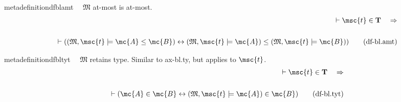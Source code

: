 \begin{restatable}{metadefinition}{dfblamt}~~ $\mathfrak{M}$ at-most is at-most.
\begin{align}
\vdash \msc{t} \in \mathbf{T}\quad\Rightarrow \notag \\ 
	 \notag \\ 
	\quad \vdash ( ( \mathfrak{M} ,
    \msc{t} \models \mc{A} \le \mc{B} ) \leftrightarrow ( \mathfrak{M} ,
    \msc{t} \models \mc{A} ) \le ( \mathfrak{M} , \msc{t} \models \mc{B} )
    )\label{eq:df-bl.amt}\tag{df-bl.amt}
\end{align}
\end{restatable}

\begin{restatable}{metadefinition}{dfbltyt}~~ $\mathfrak{M}$ retains type.
  Similar to ax-bl.ty, but applies to $\msc{t}$.
\begin{align}
\vdash \msc{t} \in \mathbf{T}\quad\Rightarrow \notag \\ 
	 \notag \\ 
	\quad \vdash ( \mc{A} \in \mc{B}
    \leftrightarrow ( \mathfrak{M} , \msc{t} \models \mc{A} ) \in \mc{B}
    )\label{eq:df-bl.tyt}\tag{df-bl.tyt}
\end{align}
\end{restatable}

